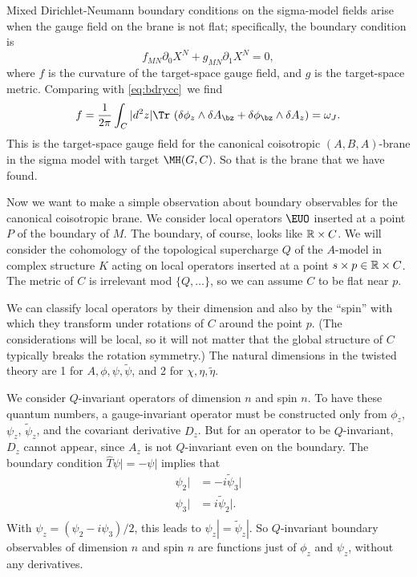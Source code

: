 Mixed Dirichlet-Neumann boundary conditions on the sigma-model
fields arise when the gauge field on the brane is not flat;
specifically, the boundary condition is %
\setcounter{equation}{32}
\begin{equation}\label{eq:zembro}
f_{MN}\partial_0 X^N+g_{MN}\partial_1 X^N=0,
\end{equation}
 where $f$ is the
curvature of the target-space gauge field, and $g$ is the
target-space metric. Comparing with \eqref{eq:bdrycc}\ we find %
\setcounter{equation}{33}
\begin{equation}\label{eq:membro}
f={1\over 2\pi}\int_C |d^2z| \Tr\, \left(\delta \phi_z\wedge\delta
A_\bz+\delta\phi_\bz\wedge \delta A_z\right)=\omega_J.
\end{equation}
 This is
the target-space gauge field for the canonical coisotropic
$(A,B,A)$-brane in the sigma model with target $\MH(G,C)$. So that
is the brane that we have found.

\par{}

Now we want to make a simple observation about boundary
observables for the canonical coisotropic brane.  We consider
local operators ${\EUO}$ inserted at a point $P$ of the boundary
of $M$. The boundary, of course, looks like $\Bbb{R}\times C$.  We
will consider the cohomology of the topological supercharge $Q$ of
the $A$-model in complex structure $K$ acting on local operators
inserted at a point $s\times p\in \Bbb{R}\times C$.  The metric of
$C$ is irrelevant mod $\{Q,\dots\}$, so we can assume $C$ to be
flat near $p$.

We can classify local operators by their dimension and also by the
``spin'' with which they transform under rotations of $C$ around
the point $p$.  (The considerations will be local, so it will not
matter that the global structure of $C$ typically breaks the
rotation symmetry.)  The natural dimensions in the twisted theory
are 1 for $A,\phi,\psi,\tilde\psi$, and 2 for
$\chi,\eta,\tilde\eta$.

We consider $Q$-invariant operators of dimension $n$ and spin $n$.
To have these quantum numbers, a gauge-invariant operator must be
constructed only from $\phi_z$, $\psi_z$, $\tilde\psi_z$, and the
covariant derivative $D_z$.  But for an operator to be
$Q$-invariant, $D_z$ cannot appear, since $A_z$ is not
$Q$-invariant even on the boundary.  The boundary condition $\hat
T\psi|=-\psi|$ implies that
\setcounter{equation}{34}
\begin{equation}\label{eq:bdrry}
\begin{aligned}\psi_2|&=-i\tilde\psi_3|\\
\psi_3|&=i\tilde\psi_2|.\\\end{aligned}
\end{equation}
 With $\psi_z=(\psi_2-i\psi_3)/2$,
this leads to $\psi_z|=\tilde\psi_z|$. So $Q$-invariant boundary
observables of dimension $n$ and spin $n$ are functions just of
$\phi_z$ and $\psi_z$, without any derivatives.

